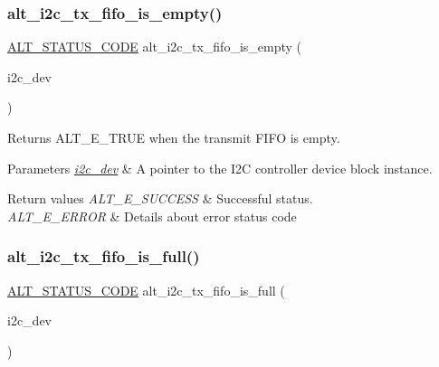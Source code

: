 \subsubsection{\texorpdfstring{alt\_i2c\_tx\_fifo\_is\_empty()}{alt\_i2c\_tx\_fifo\_is\_empty()}}
{\footnotesize\ttfamily \mbox{\hyperlink{hwlib_8h_abdb0d369f069723ca55d6c94bcaaaa12}{A\+L\+T\+\_\+\+S\+T\+A\+T\+U\+S\+\_\+\+C\+O\+DE}} alt\+\_\+i2c\+\_\+tx\+\_\+fifo\+\_\+is\+\_\+empty (\begin{DoxyParamCaption}\item[{\mbox{\hyperlink{structALT__I2C__DEV__s}{A\+L\+T\+\_\+\+I2\+C\+\_\+\+D\+E\+V\+\_\+t}} $\ast$}]{i2c\+\_\+dev }\end{DoxyParamCaption})}

Returns A\+L\+T\+\_\+\+E\+\_\+\+T\+R\+UE when the transmit F\+I\+FO is empty.


\begin{DoxyParams}{Parameters}
{\em \mbox{\hyperlink{structi2c__dev}{i2c\+\_\+dev}}} & A pointer to the I2C controller device block instance.\\
\hline
\end{DoxyParams}

\begin{DoxyRetVals}{Return values}
{\em A\+L\+T\+\_\+\+E\+\_\+\+S\+U\+C\+C\+E\+SS} & Successful status. \\
\hline
{\em A\+L\+T\+\_\+\+E\+\_\+\+E\+R\+R\+OR} & Details about error status code \\
\hline
\end{DoxyRetVals}
\mbox{\label{group__ALT__I2C__TX__FIFO_ga741f705473ce5cb1c2859f91c1dc3f6b}} 
\subsubsection{\texorpdfstring{alt\_i2c\_tx\_fifo\_is\_full()}{alt\_i2c\_tx\_fifo\_is\_full()}}
{\footnotesize\ttfamily \mbox{\hyperlink{hwlib_8h_abdb0d369f069723ca55d6c94bcaaaa12}{A\+L\+T\+\_\+\+S\+T\+A\+T\+U\+S\+\_\+\+C\+O\+DE}} alt\+\_\+i2c\+\_\+tx\+\_\+fifo\+\_\+is\+\_\+full (\begin{DoxyParamCaption}\item[{\mbox{\hyperlink{structALT__I2C__DEV__s}{A\+L\+T\+\_\+\+I2\+C\+\_\+\+D\+E\+V\+\_\+t}} $\ast$}]{i2c\+\_\+dev }\end{DoxyParamCaption})}

